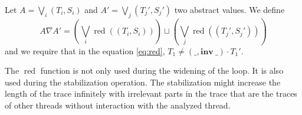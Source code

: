 \documentclass[runningheads]{llncs}
\newcommand{\inv}[1]{\mathbf{inv}\ \mathtt{#1}}
\DeclareMathOperator{\red}{red}
\begin{document}
\begin{definition}[Widening]
	Let $A = \bigvee_i (T_i, S_i)$ and $A' = \bigvee_j (T_j', S_j')$ two abstract values. We define 
	\[A \nabla A' = \left(\bigvee_i \red((T_i, S_i))\right) \sqcup \left(\bigvee_j \red((T_j', S_j')) \right)\]
	and we require that in the equation \eqref{eq:red}, $T_1 \neq (\_, \inv{\_}) \cdot T_1'$.
\end{definition}



The $\red$ function is not only used during the widening of the loop. It is also used during the stabilization operation. The stabilization might increase the length of the trace infinitely with irrelevant parts in the trace that are the traces of other threads without interaction with the analyzed thread.





















%
%
\end{document}

